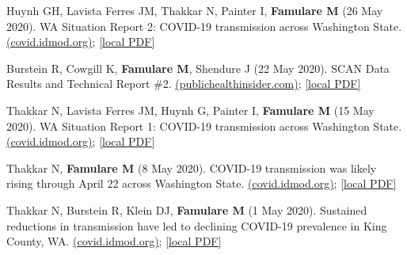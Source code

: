 \documentclass{article}
\begin{document}
\begin{llist}
\begin{items}
	\item[{[14]}] Huynh GH, Lavista Ferres JM, Thakkar N, Painter I, \textbf{Famulare M} (26 May 2020). WA Situation Report 2: COVID-19 transmission across Washington State. \href{https://iazpvnewgrp01.blob.core.windows.net/source/2021-02/reports/pdf/WA_Situation_Report_2_COVID-19_transmission_across_Washington_State.pdf}{(covid.idmod.org)}; \href{https://famulare.github.io/assets/publication-mirror/WA_Situation_Report_2_COVID-19_transmission_across_Washington_State.pdf}{[local PDF]}
	
	\item[{[13]}] Burstein R, Cowgill K, \textbf{Famulare M}, Shendure J (22 May 2020). SCAN Data Results and Technical Report \#2. \href{https://publichealthinsider.com/wp-content/uploads/2020/06/new-technical-report.pdf}{(publichealthinsider.com)}; \href{https://famulare.github.io/assets/publication-mirror/new-technical-report.pdf}{[local PDF]}
	
	\item[{[12]}] Thakkar N, Lavista Ferres JM, Huynh G, Painter I, \textbf{Famulare M} (15 May 2020). WA Situation Report 1: COVID-19 transmission across Washington State. \href{https://iazpvnewgrp01.blob.core.windows.net/source/2021-02/reports/pdf/COVID-19_transmission_patterns_across_Washington_State.pdf}{(covid.idmod.org)}; \href{https://famulare.github.io/assets/publication-mirror/COVID-19_transmission_patterns_across_Washington_State.pdf}{[local PDF]}
	
	\item[{[11]}] Thakkar N, \textbf{Famulare M} (8 May 2020). COVID-19 transmission was likely rising through April 22 across Washington State. \href{https://iazpvnewgrp01.blob.core.windows.net/source/2021-02/reports/pdf/COVID-19-transmission-likely-rising-through-April22-across-Washington-State.pdf}{(covid.idmod.org)}; \href{https://famulare.github.io/assets/publication-mirror/COVID-19-transmission-likely-rising-through-April22-across-Washington-State.pdf}{[local PDF]}
	
	\item[{[10]}] Thakkar N, Burstein R, Klein DJ, \textbf{Famulare M} (1 May 2020). Sustained reductions in transmission have led to declining COVID-19 prevalence in King County, WA. \href{https://iazpvnewgrp01.blob.core.windows.net/source/2021-02/reports/pdf/Sustained_reductions_in_transmission_have_led_to_declining_COVID_19_prevalence_in_King_County_WA.pdf}{(covid.idmod.org)}; \href{https://famulare.github.io/assets/publication-mirror/Sustained_reductions_in_transmission_have_led_to_declining_COVID_19_prevalence_in_King_County_WA.pdf}{[local PDF]}
	

\end{items}
\end{llist}
\end{document}
